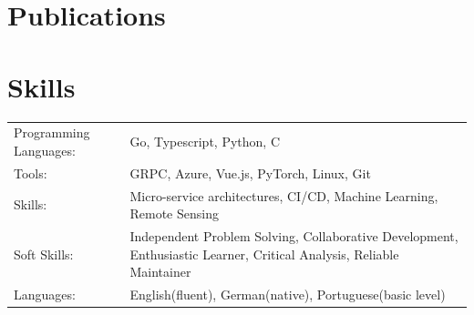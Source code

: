 \documentclass[a4paper,13pt]{article}
\begin{document}
\section{Publications}
\begin{refsection}
\nocite{*}
\printbibliography[heading=none]
\end{refsection}
\vspace{10pt}

\section{Skills}
\begin{tabularx}{\linewidth}{@{}l X@{}}
Programming Languages: &  \normalsize{Go, Typescript, Python, C}\\
Tools: & \normalsize{GRPC, Azure, Vue.js, PyTorch, Linux, Git}\\
Skills:  &  \normalsize{Micro-service architectures, CI/CD, Machine Learning, Remote Sensing}\\  
Soft Skills: & \normalsize{Independent Problem Solving, Collaborative Development, Enthusiastic Learner, Critical Analysis, Reliable Maintainer}\\  
Languages: & \normalsize{English(fluent), German(native), Portuguese(basic level)}\\
\end{tabularx}

\vfill
\end{document}
